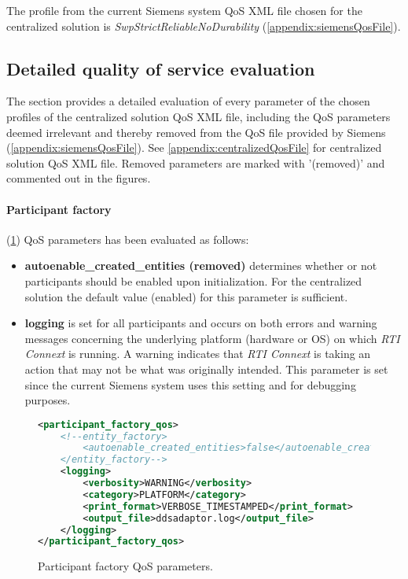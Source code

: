 The profile from the current Siemens system QoS XML file chosen for the centralized solution is \textit{SwpStrictReliableNoDurability} (\cref{appendix:siemensQosFile}).


\subsection{Detailed quality of service evaluation} \label{sec:detailedQoSDesc}


The section provides a detailed evaluation of every parameter of the chosen profiles of the centralized solution QoS XML file, including the QoS parameters deemed irrelevant and thereby removed from the QoS file provided by Siemens (\cref{appendix:siemensQosFile}). See \cref{appendix:centralizedQosFile} for centralized solution QoS XML file. Removed parameters are marked with '(removed)' and commented out in the figures.

\paragraph{Participant factory} (\cref{fig:parFacQos}) QoS parameters has been evaluated as follows:

\begin{itemize}
	\item \textbf{autoenable\_created\_entities (removed)} determines whether or not participants should be enabled upon initialization. For the centralized solution the default value (enabled) for this parameter is sufficient.
	\item \textbf{logging} is set for all participants and occurs on both errors and warning messages concerning the underlying platform (hardware or OS) on which \textit{RTI Connext} is running. A warning indicates that \textit{RTI Connext} is taking an action that may not be what was originally intended. This parameter is set since the current Siemens system uses this setting and for debugging purposes.
\end{itemize}

\begin{figure}
\begin{lstlisting}[language=XML]
<participant_factory_qos>
	<!--entity_factory>
		<autoenable_created_entities>false</autoenable_created_entities>
	</entity_factory-->
	<logging>
		<verbosity>WARNING</verbosity>
		<category>PLATFORM</category>
		<print_format>VERBOSE_TIMESTAMPED</print_format>
		<output_file>ddsadaptor.log</output_file>
	</logging>
</participant_factory_qos>
\end{lstlisting}
\caption[Participant factory QoS parameters]{
		\label{fig:parFacQos} 
		\footnotesize{Participant factory QoS parameters.}
	}
\end{figure}

